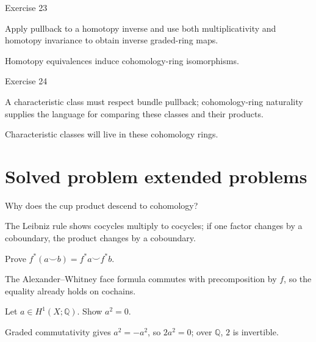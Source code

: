 \begin{exercise}\label{exr:viii29-23}
Exercise 23
\end{exercise}
\begin{hint}
Apply pullback to a homotopy inverse and use both multiplicativity and homotopy invariance to obtain inverse graded-ring maps.
\end{hint}
\begin{solution}
Homotopy equivalences induce cohomology-ring isomorphisms.
\end{solution}

\begin{exercise}\label{exr:viii29-24}
Exercise 24
\end{exercise}
\begin{hint}
A characteristic class must respect bundle pullback; cohomology-ring naturality supplies the language for comparing these classes and their products.
\end{hint}
\begin{solution}
Characteristic classes will live in these cohomology rings.
\end{solution}


\section{Solved problem extended problems}

\begin{problem}[Leibniz]\label{prob:viii29-01}
Why does the cup product descend to cohomology?
\end{problem}
\begin{solution}
The Leibniz rule shows cocycles multiply to cocycles; if one factor changes by a coboundary, the product changes by a coboundary.
\end{solution}

\begin{problem}[Naturality]\label{prob:viii29-02}
Prove \(f^*(a\smile b)=f^*a\smile f^*b\).
\end{problem}
\begin{solution}
The Alexander--Whitney face formula commutes with precomposition by \(f\), so the equality already holds on cochains.
\end{solution}

\begin{problem}\label{prob:viii29-03}
Let \(a\in H^1(X;\mathbb Q)\). Show \(a^2=0\).
\end{problem}
\begin{solution}
Graded commutativity gives \(a^2=-a^2\), so \(2a^2=0\); over \(\mathbb Q\), \(2\) is invertible.
\end{solution}

